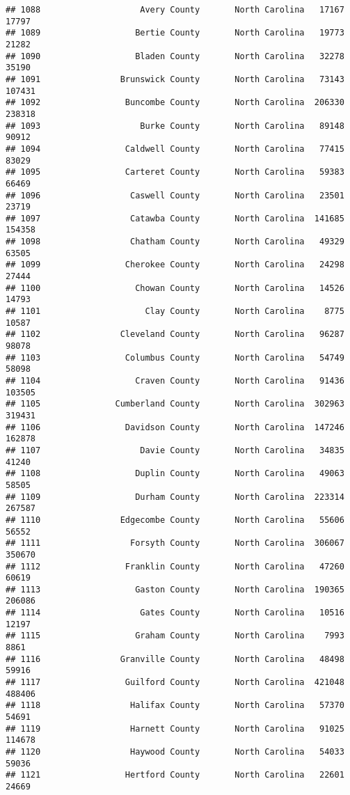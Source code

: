\documentclass[
]{article}
\begin{document}
\begin{verbatim}
## 1088                    Avery County       North Carolina   17167   17797
## 1089                   Bertie County       North Carolina   19773   21282
## 1090                   Bladen County       North Carolina   32278   35190
## 1091                Brunswick County       North Carolina   73143  107431
## 1092                 Buncombe County       North Carolina  206330  238318
## 1093                    Burke County       North Carolina   89148   90912
## 1094                 Caldwell County       North Carolina   77415   83029
## 1095                 Carteret County       North Carolina   59383   66469
## 1096                  Caswell County       North Carolina   23501   23719
## 1097                  Catawba County       North Carolina  141685  154358
## 1098                  Chatham County       North Carolina   49329   63505
## 1099                 Cherokee County       North Carolina   24298   27444
## 1100                   Chowan County       North Carolina   14526   14793
## 1101                     Clay County       North Carolina    8775   10587
## 1102                Cleveland County       North Carolina   96287   98078
## 1103                 Columbus County       North Carolina   54749   58098
## 1104                   Craven County       North Carolina   91436  103505
## 1105               Cumberland County       North Carolina  302963  319431
## 1106                 Davidson County       North Carolina  147246  162878
## 1107                    Davie County       North Carolina   34835   41240
## 1108                   Duplin County       North Carolina   49063   58505
## 1109                   Durham County       North Carolina  223314  267587
## 1110                Edgecombe County       North Carolina   55606   56552
## 1111                  Forsyth County       North Carolina  306067  350670
## 1112                 Franklin County       North Carolina   47260   60619
## 1113                   Gaston County       North Carolina  190365  206086
## 1114                    Gates County       North Carolina   10516   12197
## 1115                   Graham County       North Carolina    7993    8861
## 1116                Granville County       North Carolina   48498   59916
## 1117                 Guilford County       North Carolina  421048  488406
## 1118                  Halifax County       North Carolina   57370   54691
## 1119                  Harnett County       North Carolina   91025  114678
## 1120                  Haywood County       North Carolina   54033   59036
## 1121                 Hertford County       North Carolina   22601   24669

\end{verbatim}
\end{document}

